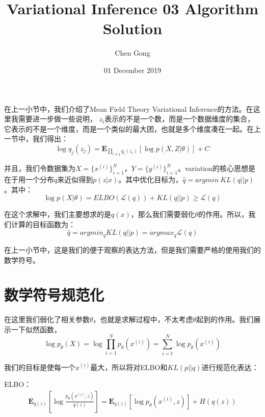 \documentclass[a4paper]{article}
\title{Variational Inference 03 Algorithm Solution}
\author{Chen Gong}
\date{01 December 2019}
\begin{document}
\maketitle

在上一小节中，我们介绍了Mean Field Theory Variational Inference的方法。在这里我需要进一步做一些说明，{\color{red} $z_i$表示的不是一个数，而是一个数据维度的集合，它表示的不是一个维度，而是一个类似的最大团，也就是多个维度凑在一起。}在上一节中，我们得出：
\begin{equation}
    \log q_j(z_j) = \mathbf{E}_{\prod_{i \neq j}q_i(z_i)}\left[ \log p(X,Z|\theta) \right] + C
\end{equation}

并且，我们令数据集为$X = \{ x^{(i)} \}_{i=1}^N$，$Y = \{ y^{(i)} \}_{i=1}^N$。variation的核心思想是在于用一个分布$q$来近似得到$p(z|x)$。其中优化目标为，$\hat{q} = argmin\ KL(q||p)$。其中：
\begin{equation}
    \log p(X|\theta) = ELBO (\mathcal{L}(q)) + KL(q||p) \geq  \mathcal{L}(q)
\end{equation}

在这个求解中，我们主要想求的是$q(x)$，那么我们需要弱化$\theta$的作用。所以，我们计算的目标函数为：
\begin{equation}
    \hat{q} = argmin_{q} KL(q||p) = argmax_q \mathcal{L}(q)
\end{equation}

在上一小节中，这是我们的便于观察的表达方法，但是我们需要严格的使用我们的数学符号。

\section{数学符号规范化}
在这里我们弱化了相关参数$\theta$，也就是求解过程中，不太考虑$\theta$起到的作用。我们展示一下似然函数，
\begin{equation}
    \log p_{\theta}(X) = \log \prod_{i=1}^N p_{\theta}(x^{(i)}) = \sum_{i=1}^N \log p_{\theta}(x^{(i)})
\end{equation}

我们的目标是使每一个$x^{(i)}$最大，所以将对ELBO和$KL(p||q)$进行规范化表达：

ELBO：
\begin{equation}
    \begin{split}
        \mathbf{E}_{q(z)}\left[ \log \frac{p_{\theta}(x^{(i)},z)}{q(z)} \right] = \mathbf{E}_{q(z)}\left[ \log p_{\theta}(x^{(i)},z) \right]+ H(q(z))
    \end{split}
\end{equation}
\end{document}
